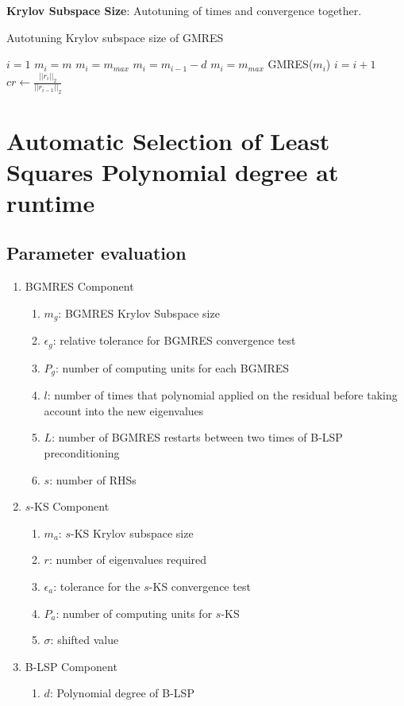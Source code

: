 \textbf{Krylov Subspace Size}: Autotuning of times and convergence together.

\begin{algorithm}[htbp]{}
	\caption{Autotuning Krylov subspace size of GMRES}   
	\label{alg:gmres-krylov-autotuning}   
	\begin{algorithmic}[1]
		
		\State $i=1$
		\State $m_i=m$
		\State $m_i=m_{max}$
		\State $m_i = m_{i-1}-d$
		\Else
		\State $m_i=m_{max}$
		\EndIf
		\EndIf
		\State GMRES($m_i$)
		\State $i=i+1$
		\State $cr \leftarrow \frac{||r_i||_2}{||r_{i-1}||_2}$
		\EndWhile
		\EndFunction
	\end{algorithmic}  
\end{algorithm}
\fi


\section{Automatic Selection of Least Squares Polynomial degree at runtime}

\subsection{Parameter evaluation}

\begin{enumerate}
	\item BGMRES Component
	\begin{enumerate}
		\item $m_g$: BGMRES Krylov Subspace size
		\item $\epsilon_g$: relative tolerance for BGMRES convergence test
		\item $P_g$: number of computing units for each BGMRES
		\item $l$: number of times that polynomial applied on the residual before taking account into the new eigenvalues
		\item $L$: number of BGMRES restarts between two times of B-LSP preconditioning
		\item $s$: number of RHSs
	\end{enumerate}
	\item $s$-KS Component
	\begin{enumerate}
		\item $m_a$: $s$-KS Krylov subspace size
		\item $r$: number of eigenvalues required
		\item $\epsilon_a$: tolerance for the $s$-KS convergence test
		\item $P_a$: number of computing units for $s$-KS
		\item  $\sigma$: shifted value
	\end{enumerate}
	\item B-LSP Component
	\begin{enumerate}
		\item $d$: Polynomial degree of B-LSP
	\end{enumerate}
\end{enumerate}


